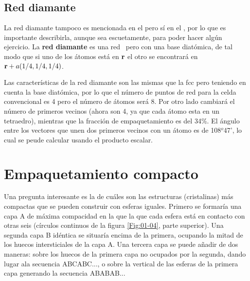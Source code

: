 \subsection{Red diamante}

La red diamante tampoco es mencionada en el \cite{Fisica_del_Estado_Solido} pero sí en el \cite{Fisica_del_Estado_Solido_Resueltos}, por lo que es importante describirla, aunque sea escuetamente, para poder hacer algún ejercicio. La \textbf{red diamante} es una red \fcc \ pero con una base diatómica, de tal modo que si uno de los átomos está en $\mathbf{r}$ el otro se encontrará en $\mathbf{r}+a(1/4,1/4,1/4)$. 

Las características de la red diamante son las mismas que la fcc pero teniendo en cuenta la base diatómica, por lo que el número de puntos de red para la celda convencional es 4 pero el número de átomos será 8. Por otro lado cambiará el número de primeros vecinos (ahora son 4, ya que cada átomo esta en un tetraedro), mientras que la fracción de empaquetamiento es del 34\%. El ángulo entre los vectores que unen dos primeros vecinos con un átomo es de 108$^o$47', lo cual se peude calcular usando el producto escalar.



\section{Empaquetamiento compacto}

Una pregunta interesante es la de cuáles son las estructuras (cristalinas) más compactas que se pueden construir con esferas iguales. Primero se formaría una capa A de máxima compacidad en la que la que cada esfera está en contacto con otras seis (círculos continuos de la figura \ref{Fig:01-04}, parte superior). Una segunda capa B idéntica se situaría encima de la primera, ocupando la mitad de los huecos intersticiales de la capa A. Una tercera capa se puede añadir de dos maneras: sobre los huecos de la primera capa no ocupados por la segunda, dando lugar ala secuencia ABCABC..., o sobre la vertical de las esferas de la primera capa generando la secuencia ABABAB...

